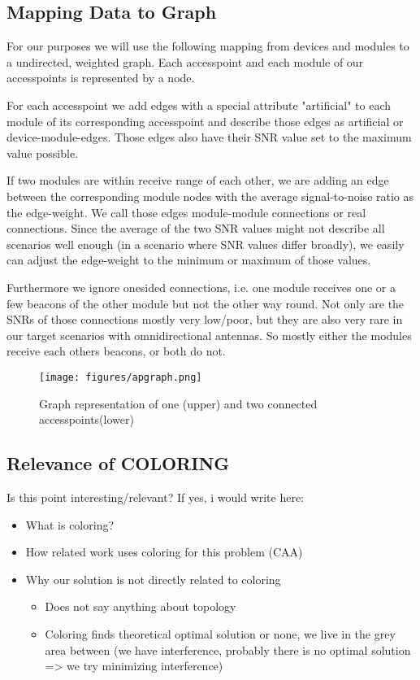   \subsection{Mapping Data to Graph}
    For our purposes we will use the following mapping from devices and modules to a undirected, weighted graph.
    Each accesspoint and each module of our accesspoints is represented by a node.
    
    For each accesspoint we add edges with a special attribute "artificial" 
    to each module of its corresponding accesspoint and describe those edges as artificial or device-module-edges.
    Those edges also have their SNR value set to the maximum value possible. 
    
    If two modules are within receive range of each other, 
    we are adding an edge between the corresponding module nodes with the average signal-to-noise ratio as the edge-weight.
    We call those edges module-module connections or real connections.
    Since the average of the two SNR values might not describe all scenarios well enough (in a scenario where SNR values differ broadly),
    we easily can adjust the edge-weight to the minimum or maximum of those values.
    
    Furthermore we ignore onesided connections, i.e. one module receives one or a few beacons of the other module but not the other way round.
    Not only are the SNRs of those connections mostly very low/poor, but they are also very rare in our target scenarios with omnidirectional antennas.
    So mostly either the modules receive each others beacons, or both do not.
    \begin{figure}[th!]
      \centering
      \texttt{[image: figures/apgraph.png]}
      \caption{Graph representation of one (upper) and two connected accesspoints(lower)}
      \label{fig:apgraph}
    \end{figure}
    
  \subsection{Relevance of COLORING}
    Is this point interesting/relevant?
    If yes, i would write here:
      \begin{itemize}
       \item What is coloring?
       \item How related work uses coloring for this problem (CAA)
       \item Why our solution is not directly related to coloring
	\begin{itemize}
	 \item Does not say anything about topology
	 \item Coloring finds theoretical optimal solution or none, 
	  we live in the grey area between (we have interference, probably there is no optimal solution => we try minimizing interference)
	\end{itemize}
      \end{itemize}
